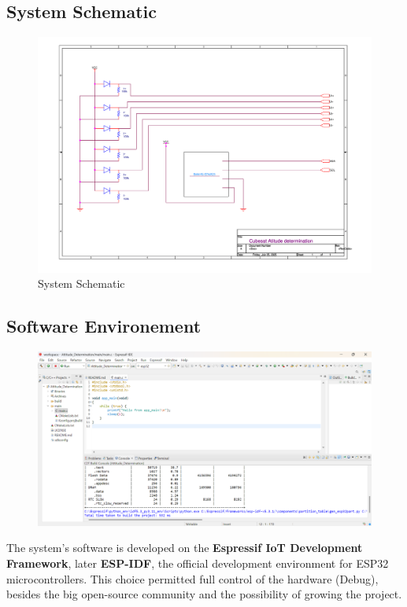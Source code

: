 \documentclass[a4paper, 12pt]{article}
\begin{document}
\subsection{System Schematic}
\begin{figure}[H]  %
    \centering
    \includegraphics[width=1\textwidth]{fig/cubesatSchematic.png}
    \caption{System Schematic}
    \label{fig:System Schematic}
\end{figure}

\subsection{Software Environement}
\begin{figure}[H] 
    \centering
    \includegraphics[width=1\linewidth]{fig/ESPIDF.png}
    \label{fig:ESP-IDF}
\end{figure}
The system's software is developed on the \textbf{Espressif IoT Development Framework}, later \textbf{ESP-IDF}, the official development environment for ESP32 microcontrollers. This choice permitted full control of the hardware (Debug), besides the big open-source community and the possibility of growing the project.
\end{document}
